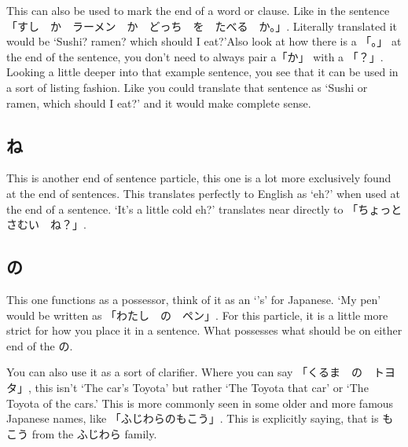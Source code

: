 This can also be used to mark the end of a word or clause. Like in the sentence 「すし　か　ラーメン　か　どっち　を　たべる　か。」. Literally translated it would be `Sushi? ramen? which should I eat?'\footnotemark Also look at how there is a 「。」 at the end of the sentence, you don't need to always pair a「か」 with a 「？」. Looking a little deeper into that example sentence, you see that it can be used in a sort of listing fashion. Like you could translate that sentence as `Sushi or ramen, which should I eat?' and it would make complete sense. 


\subsection*{ね}\label{ssec:PR;文法;助詞;ね}

This is another end of sentence particle, this one is a lot more exclusively found at the end of sentences. This translates perfectly to English as `eh?' when used at the end of a sentence. `It's a little cold eh?' translates near directly to 「ちょっと　さむい　ね？」.

\subsection*{の}\label{ssec:PR;文法;助詞;の}

This one functions as a possessor, think of it as an `'s' for Japanese. `My pen' would be written as 「わたし　の　ペン」. For this particle, it is a little more strict for how you place it in a sentence. What possesses what should be on either end of the の.

You can also use it as a sort of clarifier. Where you can say 「くるま　の　トヨタ」, this isn't `The car's Toyota' but rather `The Toyota that car' or `The Toyota of the cars.' This is more commonly seen in some older and more famous Japanese names, like 「ふじわらのもこう」. This is explicitly saying, that is もこう from the ふじわら family. 
